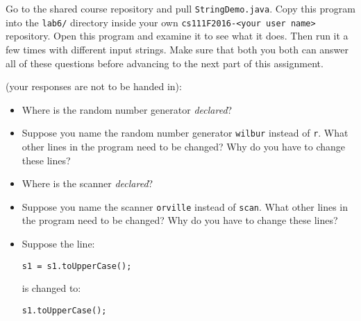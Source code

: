 Go to the shared course repository and pull {\tt StringDemo.java}. Copy this program into the {\tt lab6/} directory
inside your own {\tt cs111F2016-<your user name>} repository. Open this program and examine it to see what it does.
Then run it a few times with different input strings. Make sure that both you both can answer all of these questions
before advancing to the next part of this assignment. \\

\vspace{-0.05in}

(your responses are not to be handed in):
\begin{itemize}
\item Where is the random number generator {\em declared}?
\item Suppose you name the random number generator {\tt wilbur} instead of {\tt r}.
What other lines in the program need to be changed? Why do you have to change these lines?
\item Where is the scanner {\em declared}?
\item Suppose you name the scanner {\tt orville} instead of {\tt scan}.
What other lines in the program need to be changed? Why do you have to change these lines?
\item
Suppose the line:

\vspace*{-.2in}
\begin{center}
\verb$s1 = s1.toUpperCase();$
\end{center}
\vspace*{-.2in}

is changed to:

\vspace*{-.2in}
\begin{center}
\verb$s1.toUpperCase();$
\end{center}


\end{itemize}
